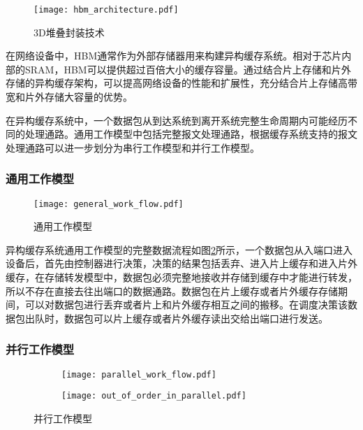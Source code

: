 \begin{figure}[H]
  \centering
  \texttt{[image: hbm\_architecture.pdf]}
  \caption{3D堆叠封装技术}
  \label{fig:c2:hbm architecture}
\end{figure}

在网络设备中，HBM通常作为外部存储器用来构建异构缓存系统。相对于芯片内部的SRAM，HBM可以提供超过百倍大小的缓存容量。通过结合片上存储和片外存储的异构缓存架构，可以提高网络设备的性能和扩展性，充分结合片上存储高带宽和片外存储大容量的优势。


在异构缓存系统中，一个数据包从到达系统到离开系统完整生命周期内可能经历不同的处理通路。通用工作模型中包括完整报文处理通路，根据缓存系统支持的报文处理通路可以进一步划分为串行工作模型和并行工作模型。

\subsubsection{通用工作模型}

\begin{figure}[H]
  \centering
  \texttt{[image: general\_work\_flow.pdf]}
  \caption{通用工作模型}
  \label{fig:c2:general work flow}
\end{figure}

异构缓存系统通用工作模型的完整数据流程如图\ref{fig:c2:general work flow}所示，一个数据包从入端口进入设备后，首先由控制器进行决策，决策的结果包括丢弃、进入片上缓存和进入片外缓存，在存储转发模型中，数据包必须完整地接收并存储到缓存中才能进行转发，所以不存在直接去往出端口的数据通路。数据包在片上缓存或者片外缓存存储期间，可以对数据包进行丢弃或者片上和片外缓存相互之间的搬移。在调度决策该数据包出队时，数据包可以片上缓存或者片外缓存读出交给出端口进行发送。

\subsubsection{并行工作模型}

\begin{figure}[H]
  \begin{subfigure}[b]{0.49\linewidth}
      \centering
      \texttt{[image: parallel\_work\_flow.pdf]}
      \label{subfig:c2:parallel work flow}
  \end{subfigure}
  \begin{subfigure}[b]{0.49\linewidth}
      \centering
      \texttt{[image: out\_of\_order\_in\_parallel.pdf]}
      \label{subfig:c2:out of order}
  \end{subfigure}
  \caption{并行工作模型}
\end{figure}

